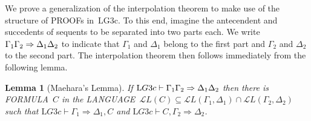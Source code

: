 \documentclass[10pt,a4paper]{article}
\newcommand*{\olup}[1]{\MakeUppercase{#1}}
\theoremstyle{plain}
\newtheorem{lem}[thm]{Lemma}
\theoremstyle{definition}
\theoremstyle{remark}
\newcommand*{\ollabel}[1]{\label{#1}}
\providecommand{\Sequent}{\mathrel{\Rightarrow}}
\providecommand{\Proves}{\mathrel{\vdash}}
\providecommand{\Lang}{\ensuremath{\mathcal{L}}}
\providecommand{\Log}{\ensuremath{\mathrm{L}}}
\providecommand{\maeh}{\relax}
\begin{document}
We prove a generalization of the interpolation theorem to make use of
the structure of \olup{proof}s in~\Log{G3c}. To this end, imagine the
antecendent and succedents of sequents to be separated into two parts
each. We write $\maeh{\Gamma_1}{\Gamma_2} \Sequent
\maeh{\Delta_1}{\Delta_2}$ to indicate that $\Gamma_1$ and $\Delta_1$
belong to the first part and $\Gamma_2$ and $\Delta_2$ to the second
part. The interpolation theorem then follows immediately from the
following lemma.

\begin{lem}[Maehara's Lemma]\ollabel{lem:maehara} If $\Log{G3c}
\Proves \maeh{\Gamma_1}{\Gamma_2} \Sequent \maeh{\Delta_1}{\Delta_2}$
then there is \olup{formula}~$C$ in the \olup{language}~$\Lang L(C)
\subseteq \Lang L(\Gamma_1,
\Delta_1) \cap \Lang L(\Gamma_2, \Delta_2)$ such that $\Log{G3c}
\Proves \Gamma_1 \Sequent \Delta_1, C$ and $\Log{G3c} \Proves C,
\Gamma_2 \Sequent \Delta_2$.
\end{lem}
\end{document}
